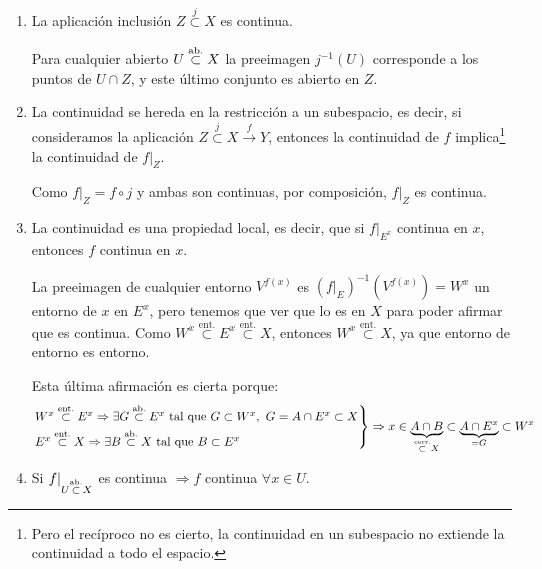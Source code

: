 \begin{obs}
\begin{enumerate}
    \item La aplicación inclusión $Z \stackrel{j}{\subset} X$ es continua.
    \begin{demo}
     Para cualquier abierto $U \stackrel{\text{ab.}}{\subset} X$ la preeimagen $j^{-1}\left( U \right)$ corresponde a los puntos de $U \cap Z$, y este último conjunto es abierto en $Z$.
    \end{demo}

    \item La continuidad se hereda en la restricción a un subespacio, es decir, si consideramos la aplicación $Z \stackrel{j}{\subset} X \xrightarrow{f} Y$, entonces la continuidad de $f$ implica\footnote{Pero el recíproco no es cierto, la continuidad en un subespacio no extiende la continuidad a todo el espacio.} la continuidad de $f|_Z$.
    \begin{demo}
    Como $f|_Z = f \circ j$ y ambas son continuas, por composición, $f|_Z$ es continua.
    \end{demo}

    \item La continuidad es una propiedad local, es decir, que si $f|_{E^x}$ continua en $x$, entonces $f$ continua en $x$.
    \begin{demo}
	La preeimagen de cualquier entorno $V^{f\left( x \right)}$ es $\left( f|_{E} \right)^{-1} \left( V^{f\left( x \right)} \right) = W^x$ un entorno de $x$ en $E^x$, pero tenemos que ver que lo es en $X$ para poder afirmar que es continua.
	Como $W^x \stackrel{\text{ent.}}{\subset} E^x \stackrel{\text{ent.}}{\subset} X$, entonces $W^x \stackrel{\text{ent.}}{\subset}X$, ya que entorno de entorno es entorno.
	
	Esta última afirmación es cierta porque:
        \[
        \begin{rcases}
           	W^x \stackrel{\text{ent.}}{\subset} E^x \Rightarrow \exists G \stackrel{\text{ab.}}{\subset} E^x \mbox{ tal que }G \subset W^x, \ G = A \cap E^x \subset X\\ 
            E^x \stackrel{\text{ent.}}{\subset} X \Rightarrow \exists B \stackrel{\text{ab.}}{\subset} X \mbox{ tal que } B \subset E^x
        \end{rcases} \Rightarrow x \in \underbrace{A \cap B}_{\stackrel{\text{cerr.}}{\subset} X} \subset \underbrace{A \cap E^x}_{= G}  \subset W^x
        \]
    \end{demo}

    \item Si $f|_{U \stackrel{\text{ab.}}{\subset} X}$ es continua $\Rightarrow f$ continua $\forall x \in U$.


\end{enumerate}
\end{obs}
